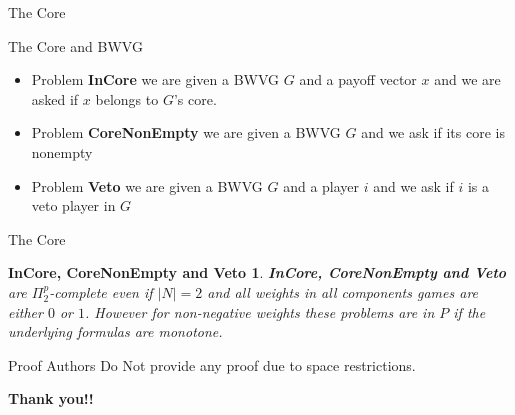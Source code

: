\documentclass{beamer}
\begin{document}
\begin{frame}[fragile]{The Core}
  \begin{block}{The Core and BWVG}
    \begin{itemize}
      \item Problem \textbf{InCore} we are given a BWVG $G$ and a payoff vector $x$ and we are asked if $x$ belongs to $G$'s core.
      \item Problem \textbf{CoreNonEmpty} we are given a BWVG $G$ and we ask if its core is nonempty
      \item Problem \textbf{Veto} we are given a BWVG $G$ and a player $i$ and we ask if $i$ is a veto player in $G$
    \end{itemize}
  \end{block}
\end{frame}

\begin{frame}[fragile]{The Core}
  \newtheorem{theorem6}{InCore, CoreNonEmpty and Veto}
  \begin{theorem6}
    \textbf{InCore, CoreNonEmpty and Veto} are $\Pi_2^p$-complete even if $|N| = 2$ and all weights in all components games are either $0$ or $1$.
    However for non-negative weights these problems are in $P$ if the underlying formulas are monotone.
  \end{theorem6}
  \begin{block}{Proof}
    Authors Do Not provide any proof due to space restrictions.
  \end{block}
\end{frame}

\begin{frame}
  \begin{center}
    \textbf{\huge{Thank you!!}}
    \end{center}
\end{frame}
\end{document}
